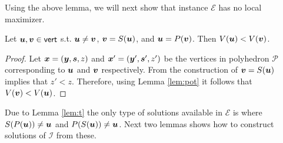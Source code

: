 \documentclass[a4paper,UKenglish]{lipics2}
\theoremstyle{definition}
\def\pot{\mbox{$V$}}
\def\vert{\operatorname{\mathsf{vert}}}
\newcommand{\CPol}{\mbox{${\mathcal P}$}}
\newcommand{\CI}{\mbox{${\mathcal I}$}}
\newcommand{\CE}{\mbox{${\mathcal E}$}}
\newcommand{\yy}{\mbox{\boldmath $y$}}
\newcommand{\uu}{\mbox{\boldmath $u$}}
\newcommand{\vv}{\mbox{\boldmath $v$}}
\newcommand{\xx}{\mbox{\boldmath $x$}}
\newcommand{\ps}{\mbox{\boldmath $s$}}
\begin{document}
Using the above lemma, we will next show that instance $\CE$ has no local maximizer. 

\begin{lemma}\label{lem:t}
Let $\uu,\vv \in \vert$ s.t. $\uu\neq \vv$, $\vv=S(\uu)$, and $\uu=P(\vv)$. Then $\pot(\uu)< \pot(\vv)$.
\end{lemma}
\begin{proof}
Let $\xx=(\yy,\ps,z)$ and $\xx'=(\yy',\ps',z')$ be the vertices in polyhedron $\CPol$ corresponding to $\uu$ and $\vv$ respectively. From the construction of $\vv=S(\uu)$ implies that $z'<z$. Therefore, using Lemma \ref{lem:pot} it follows that $\pot(\vv)<\pot(\uu)$.
\end{proof}

Due to Lemma \ref{lem:t} the only type of solutions available in $\CE$ is where $S(P(\uu))\neq \uu$ and $P(S(\uu))\neq \uu$. Next two lemmas shows how to construct solutions of $\CI$ from these. 
\end{document}
